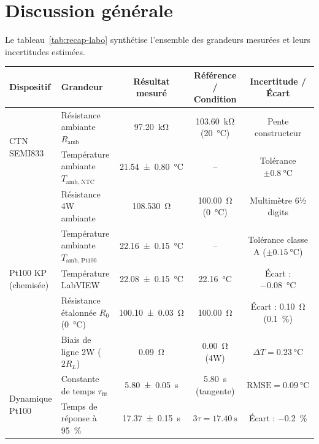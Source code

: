 \chapter{Discussion générale}
\label{chap:analyse}

\vspace{-12pt}
Le tableau~\ref{tab:recap-labo} synthétise l'ensemble des grandeurs mesurées et leurs incertitudes estimées.

\vspace{-6pt}
\begin{table}[H]
  \centering
  \scriptsize
  \setlength{\tabcolsep}{2.5pt}
  \renewcommand{\arraystretch}{0.95}
  \begin{tabularx}{\textwidth}{l >{\raggedright\arraybackslash}X c c c}
    \toprule
    \textbf{Dispositif} & \textbf{Grandeur} & \textbf{Résultat mesuré} & \textbf{Référence / Condition} & \textbf{Incertitude / Écart} \\
    \midrule
    \multirow{2}{*}{CTN SEMI833} & Résistance ambiante $R_{\text{amb}}$ & \qty{97.20}{\kilo\ohm} & \qty{103.60}{\kilo\ohm} (\qty{20}{\degreeCelsius}) & Pente constructeur \\
     & Température ambiante $T_{\text{amb, NTC}}$ & \qty{21.54 \pm 0.80}{\degreeCelsius} & -- & Tolérance $\pm \qty{0.8}{\degreeCelsius}$ \\
    \midrule
    \multirow{5}{*}{Pt100 KP (chemisée)} & Résistance 4W ambiante & \qty{108.530}{\ohm} & \qty{100.00}{\ohm} (\qty{0}{\degreeCelsius}) & Multimètre 6½ digits \\
     & Température ambiante $T_{\text{amb, Pt100}}$ & \qty{22.16 \pm 0.15}{\degreeCelsius} & -- & Tolérance classe A ($\pm \qty{0.15}{\degreeCelsius}$) \\
     & Température LabVIEW & \qty{22.08 \pm 0.15}{\degreeCelsius} & \qty{22.16}{\degreeCelsius} & Écart : \qty{-0.08}{\degreeCelsius} \\
     & Résistance étalonnée $R_0$ (\qty{0}{\degreeCelsius}) & \qty{100.10 \pm 0.03}{\ohm} & \qty{100.00}{\ohm} & Écart : \qty{+0.10}{\ohm} (\qty{+0.1}{\percent}) \\
     & Biais de ligne 2W ($2 R_L$) & \qty{0.09}{\ohm} & \qty{0.00}{\ohm} (4W) & $\Delta T = \qty{+0.23}{\degreeCelsius}$ \\
    \midrule
    \multirow{2}{*}{Dynamique Pt100} & Constante de temps $\tau_{\text{fit}}$ & \qty{5.80 \pm 0.05}{\second} & \qty{5.80}{\second} (tangente) & $\text{RMSE} = \qty{0.09}{\degreeCelsius}$ \\
     & Temps de réponse à \qty{95}{\percent} & \qty{17.37 \pm 0.15}{\second} & $3\tau = \qty{17.40}{\second}$ & Écart : \qty{-0.2}{\percent} \\

\end{tabularx}
\end{table}

